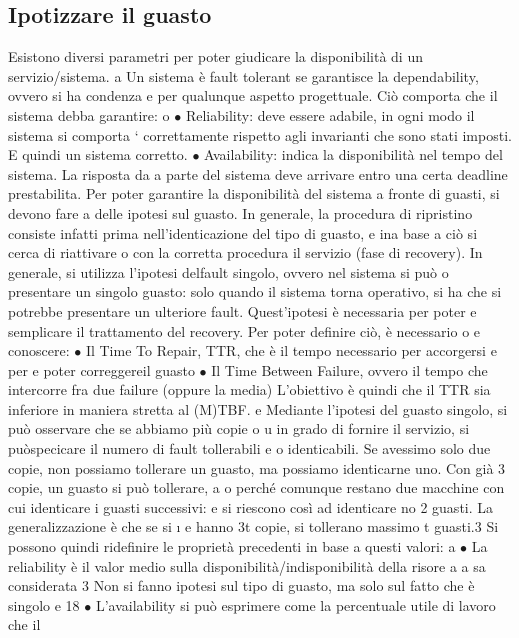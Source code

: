 \subsection{Ipotizzare il guasto}
Esistono diversi parametri per poter giudicare la disponibilità di un servizio/sistema.
a
Un sistema è fault tolerant se garantisce la dependability, ovvero si ha condenza
e
per qualunque aspetto progettuale. Ciò comporta che il sistema debba garantire:
o
$\bullet$ Reliability: deve essere adabile, in ogni modo il sistema si comporta
`
correttamente rispetto agli invarianti che sono stati imposti. E quindi un
sistema corretto.
$\bullet$ Availability: indica la disponibilità nel tempo del sistema. La risposta da
a
parte del sistema deve arrivare entro una certa deadline prestabilita.
Per poter garantire la disponibilità del sistema a fronte di guasti, si devono fare
a
delle ipotesi sul guasto. In generale, la procedura di ripristino consiste infatti
prima nell'identicazione del tipo di guasto, e ina base a ciò si cerca di riattivare
o
con la corretta procedura il servizio (fase di recovery).
In generale, si utilizza l'ipotesi delfault singolo, ovvero nel sistema si può
o
presentare un singolo guasto: solo quando il sistema torna operativo, si ha che
si potrebbe presentare un ulteriore fault. Quest'ipotesi è necessaria per poter
e
semplicare il trattamento del recovery. Per poter definire ciò, è necessario
o e
conoscere:
$\bullet$ Il Time To Repair, TTR, che è il tempo necessario per accorgersi e per
e
poter correggereil guasto
$\bullet$ Il Time Between Failure, ovvero il tempo che intercorre fra due failure
(oppure la media)
L'obiettivo è quindi che il TTR sia inferiore in maniera stretta al (M)TBF.
e
Mediante l'ipotesi del guasto singolo, si può osservare che se abbiamo più copie
o
u
in grado di fornire il servizio, si puòspecicare il numero di fault tollerabili e
o
identicabili. Se avessimo solo due copie, non possiamo tollerare un guasto,
ma possiamo identicarne uno. Con già 3 copie, un guasto si può tollerare,
a
o
perché comunque restano due macchine con cui identicare i guasti successivi:
e
si riescono così ad identicare no 2 guasti. La generalizzazione è che se si
\i{}
e
hanno 3t copie, si tollerano massimo t guasti.3 Si possono quindi ridefinire le
proprietà precedenti in base a questi valori:
a
$\bullet$ La reliability è il valor medio sulla disponibilità/indisponibilità della risore
a
a
sa considerata
3 Non
si fanno ipotesi sul tipo di guasto, ma solo sul fatto che è singolo
e
18
$\bullet$ L'availability si può esprimere come la percentuale utile di lavoro che il
